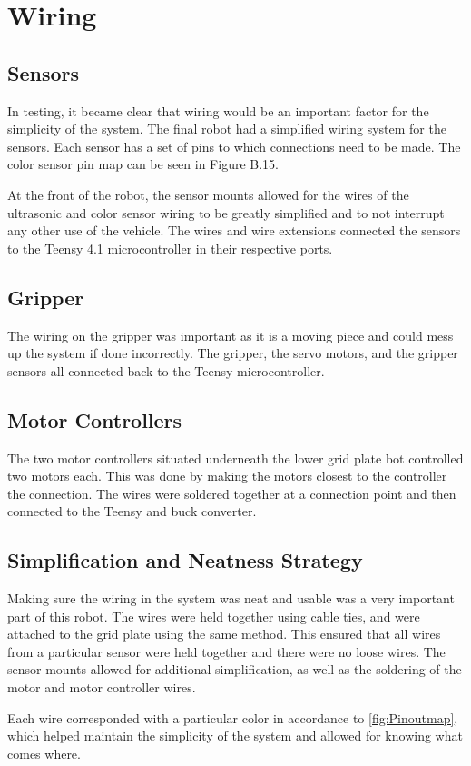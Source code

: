 \documentclass[11pt]{report}
\begin{document}
\section{Wiring}\label{sec:wiring}
\subsection{Sensors}
In testing, it became clear that wiring would be an important factor for the simplicity of the system. The final robot had a simplified wiring system for the sensors. Each sensor has a set of pins to which connections need to be made. The color sensor pin map can be seen in Figure B.15. 
\par At the front of the robot, the sensor mounts allowed for the wires of the ultrasonic and color sensor wiring to be greatly simplified and to not interrupt any other use of the vehicle. The wires and wire extensions connected the sensors to the Teensy 4.1 microcontroller in their respective ports.

\subsection{Gripper}
The wiring on the gripper was important as it is a moving piece and could mess up the system if done incorrectly. The gripper, the servo motors, and the gripper sensors all connected back to the Teensy microcontroller. 

\subsection{Motor Controllers}
The two motor controllers situated underneath the lower grid plate bot controlled two motors each. This was done by making the motors closest to the controller the connection. The wires were soldered together at a connection point and then connected to the Teensy and buck converter. 

\subsection{Simplification and Neatness Strategy}
Making sure the wiring in the system was neat and usable was a very important part of this robot. The wires were held together using cable ties, and were attached to the grid plate using the same method. This ensured that all wires from a particular sensor were held together and there were no loose wires. The sensor mounts allowed for additional simplification, as well as the soldering of the motor and motor controller wires. 
\par Each wire corresponded with a particular color in accordance to \cref{fig:Pinoutmap}, which helped maintain the simplicity of the system and allowed for knowing what comes where. 
\end{document}
